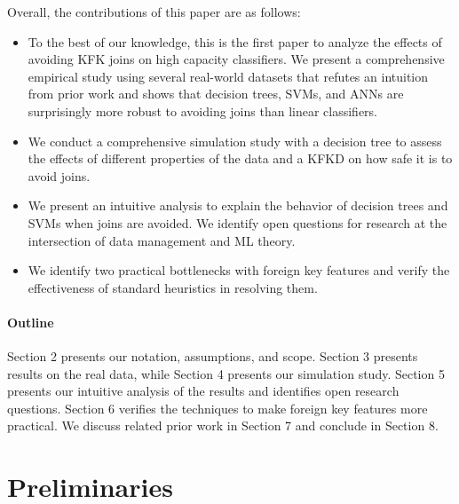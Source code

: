 \documentclass{vldb}
\newenvironment{packeditems}{
\begin{itemize}
  \setlength{\itemsep}{1pt}
  \setlength{\parskip}{0pt}
  \setlength{\parsep}{0pt}
}{\end{itemize}}
\begin{document}
\vspace{1mm}
\noindent Overall, the contributions of this paper are as follows:

\begin{packeditems}
\item To the best of our knowledge, this is the first paper to analyze the effects of avoiding KFK joins on high capacity classifiers.
We present a comprehensive empirical study using several real-world datasets that refutes an intuition from prior work and shows
that decision trees, SVMs, and ANNs are surprisingly more robust to avoiding joins than linear classifiers.

\item We conduct a comprehensive simulation study with a decision tree to assess the effects of different properties of the data 
and a KFKD on how safe it is to avoid joins.

\item We present an intuitive analysis to explain the behavior of decision trees and SVMs when joins are avoided. We identify 
open questions for research at the intersection of data management and ML theory.

\item We identify two practical bottlenecks with foreign key features and verify the effectiveness of standard heuristics in resolving them.
\end{packeditems}


\paragraph*{\textbf{Outline}} Section 2 presents our notation, assumptions, and scope. 
Section 3 presents results on the real data, while Section 4 presents our simulation study. Section 5 presents 
our intuitive analysis of the results and identifies open research questions.
Section 6 verifies the techniques to make foreign key features more practical. 
We discuss related prior work in Section 7 and conclude in Section 8.

\section{Preliminaries}
\end{document}
